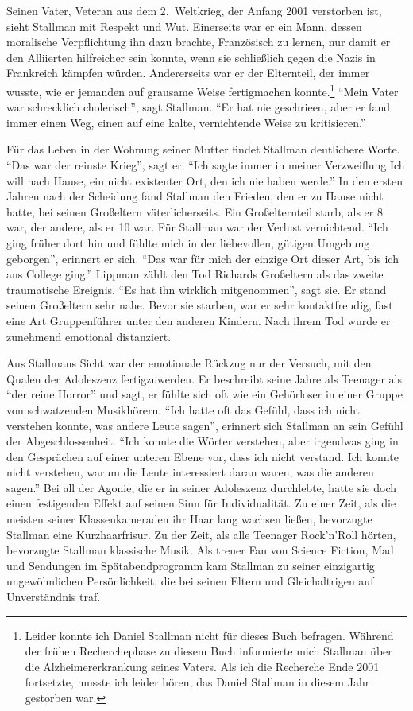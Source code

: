 Seinen Vater, Veteran aus dem 2.~Weltkrieg, der Anfang 2001 verstorben ist, sieht Stallman mit Respekt und Wut. Einerseits war er ein Mann, dessen moralische Verpflichtung ihn dazu brachte, Französisch zu lernen, nur damit er den Alliierten hilfreicher sein konnte, wenn sie schließlich gegen die Nazis in Frankreich kämpfen würden. 
Andererseits war er der Elternteil, der immer wusste, wie er jemanden auf grausame Weise fertigmachen konnte.\footnote{Leider konnte ich Daniel Stallman nicht für dieses Buch befragen. Während der frühen Recherchephase zu diesem Buch informierte mich Stallman über die Alzheimererkrankung seines Vaters. Als ich die Recherche Ende 2001 fortsetzte, musste ich leider hören, das Daniel Stallman in diesem Jahr gestorben war.}
"`Mein Vater war schrecklich cholerisch"', sagt Stallman. "`Er hat nie geschrieen, aber er fand immer einen Weg, einen auf eine kalte, vernichtende Weise zu kritisieren."'

Für das Leben in der Wohnung seiner Mutter findet Stallman deutlichere Worte. "`Das war der reinste Krieg"', sagt er. "`Ich sagte immer in meiner Verzweiflung \glq Ich will nach Hause\grq, ein nicht existenter Ort, den ich nie haben werde."'
In den ersten Jahren nach der Scheidung fand Stallman den Frieden, den er zu Hause nicht hatte, bei seinen Großeltern väterlicherseits. Ein Großelternteil starb, als er 8 war, der andere, als er 10 war. Für Stallman war der Verlust vernichtend. "`Ich ging früher dort hin und fühlte mich in der liebevollen, gütigen Umgebung geborgen"', erinnert er sich. "`Das war für mich der einzige Ort dieser Art, bis ich ans College ging."'
Lippman zählt den Tod Richards Großeltern als das zweite traumatische Ereignis. "`Es hat ihn wirklich mitgenommen"', sagt sie. Er stand seinen Großeltern sehr nahe. Bevor sie starben, war er sehr kontaktfreudig, fast eine Art Gruppenführer unter den anderen Kindern. Nach ihrem Tod wurde er zunehmend emotional distanziert.

Aus Stallmans Sicht war der emotionale Rückzug nur der Versuch, mit den Qualen der Adoleszenz fertigzuwerden. Er beschreibt seine Jahre als Teenager als "`der reine Horror"' und sagt, er fühlte sich oft wie ein Gehörloser in einer Gruppe von schwatzenden Musikhörern. "`Ich hatte oft das Gefühl, dass ich nicht verstehen konnte, was andere Leute sagen"', erinnert sich Stallman an sein Gefühl der Abgeschlossenheit. "`Ich konnte die Wörter verstehen, aber irgendwas ging in den Gesprächen auf einer unteren Ebene vor, dass ich nicht verstand. Ich konnte nicht verstehen, warum die Leute interessiert daran waren, was die anderen sagen."'
Bei all der Agonie, die er in seiner Adoleszenz durchlebte, hatte sie doch einen festigenden Effekt auf seinen Sinn für Individualität. Zu einer Zeit, als die meisten seiner Klassenkameraden ihr Haar lang wachsen ließen, bevorzugte Stallman eine Kurzhaarfrisur. Zu der Zeit, als alle Teenager Rock'n'Roll hörten, bevorzugte Stallman klassische Musik. Als treuer Fan von Science Fiction, Mad und Sendungen im Spätabendprogramm kam Stallman zu seiner einzigartig ungewöhnlichen Persönlichkeit, die bei seinen Eltern und Gleichaltrigen auf Unverständnis traf.

